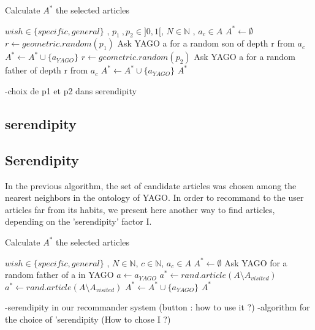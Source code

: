 \documentclass[11pt]{article}
\theoremstyle{plain}
\theoremstyle{definition}
\theoremstyle{remark}
\begin{document}
\begin{algorithm}
  \caption{Calculate $A^*$ the selected articles}
  \begin{algorithmic}
    \REQUIRE $wish \in \{specific , general\}$ , $p_1 \: ,p_2 \in ]0,1[ $, $N \in \mathbb{N}$ , $a_c \in A$
    \STATE $A^* \leftarrow \emptyset$
    \STATE $ r \leftarrow geometric.random(p_1)$
    \STATE Ask YAGO a for a random son of depth r from $a_c$
    \STATE $ A^* \leftarrow A^* \cup \{a_{YAGO}\}$
    \ELSE
    \STATE $ r \leftarrow geometric.random(p_2)$
    \STATE Ask YAGO a for a random father of depth r from $a_c$
    \STATE $ A^*  \leftarrow A^* \cup \{a_{YAGO}\}$ 
    \ENDIF
    \ENDWHILE
    \RETURN $A^*$
  \end{algorithmic}
\end{algorithm}

-choix de p1 et p2 dans serendipity

\newpage
\subsection{serendipity}
\subsection{Serendipity}

In the previous algorithm, the set of candidate articles was chosen among the nearest neighbors in the ontology of YAGO.
In order to recommand to the user articles far from its habits, we present here another way to find articles, depending on the 'serendipity' factor I.
\begin{algorithm}
  \caption{Calculate $A^*$ the selected articles}
  \begin{algorithmic}
    \REQUIRE $wish \in \{specific , general\}$ , $N \in \mathbb{N}$, $c \in \mathbb{N}$, $a_c\in A$
    \STATE $A^* \leftarrow \emptyset$
    \STATE Ask YAGO for a random father of a in YAGO 
    \STATE $a \leftarrow a_{YAGO}$ 
    \ENDWHILE
    \STATE $a^* \leftarrow rand.article(A\setminus A_{visited})$
    \STATE $a^*\leftarrow rand.article(A\setminus A_{visited})$
    \ENDWHILE
    \STATE $ A^* \leftarrow A^* \cup \{a_{YAGO}\}$
    \ENDWHILE
    \RETURN $A^*$
  \end{algorithmic}
\end{algorithm}

-serendipity in our recommander system (button : how to use it ?)
-algorithm for the choice of 'serendipity (How to chose I ?)
\end{document}
